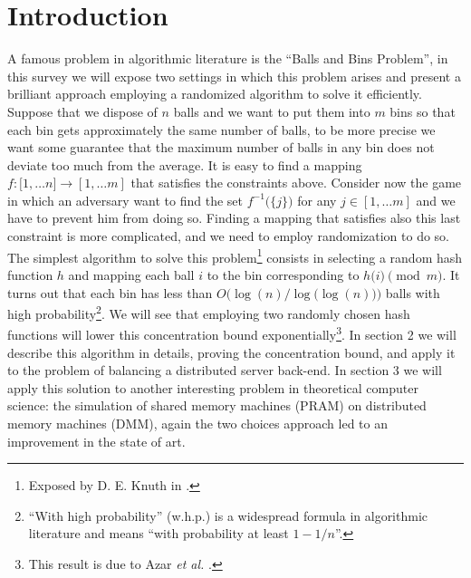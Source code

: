 \section{Introduction}

A famous problem in algorithmic literature is the ``Balls and Bins Problem'',
in this survey we will expose two settings in which this problem arises
and present a brilliant approach employing a randomized algorithm to
solve it efficiently.
Suppose that we dispose of $n$ balls and we want to put them into $m$
bins so that each bin gets approximately the same number of balls, to be
more precise we want some guarantee that the maximum number of balls
in any bin does not deviate too much from the average. It is easy to find
a mapping $f:\bigl[1,\dots n]\longrightarrow[1,\dots m]$ that satisfies the
constraints above. Consider now the game in which an adversary want to
find the set $f^{-1}\bigl(\{j\}\bigr)$ for any $j \in [1,\dots m]$ and we
have to prevent him from doing so. Finding a mapping that satisfies also
this last constraint is more complicated,
and we need to employ randomization to do so.
The simplest algorithm to solve this problem\footnote{Exposed by D. E. Knuth in \cite{Knuth}.} consists in selecting a random
hash function $h$ and mapping each ball $i$ to the bin corresponding to
$h\bigl(i\bigr) \pmod{m}$. It turns out that each bin has
less than $O\bigl(\log(n) / \log\bigl(\log(n)\bigr)\bigr)$ balls with high probability\footnote{``With high
  probability'' (w.h.p.) is a widespread formula in
  algorithmic literature and means ``with
  probability at least $1 - 1 / n$''.}. We will see that employing two randomly
chosen hash functions will lower this concentration bound exponentially\footnote{This result is due to Azar
  {\em et al.} \cite{Azar}.}.
In section 2 we will describe this algorithm in details, proving the
concentration bound, and apply it to the problem of balancing a distributed
server back-end. In section 3 we will apply this solution to another interesting
problem in theoretical computer science: the simulation of shared memory
machines (PRAM) on distributed memory machines (DMM), again the two choices approach led to an improvement in the state of
art. 

